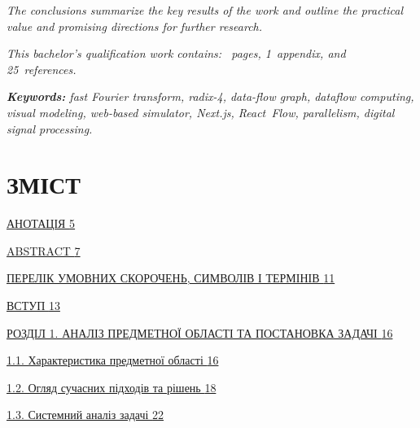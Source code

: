 \documentclass[
]{article}
\begin{document}
\emph{The conclusions summarize the key results of the work and outline
the practical value and promising directions for further research.}

\emph{This bachelor's qualification work contains: ~pages, 1~appendix,
and 25~references.}

\emph{\textbf{Keywords:} fast Fourier transform, radix-4, data-flow
graph, dataflow computing, visual modeling, web-based simulator,
Next.js, React~Flow, parallelism, digital signal processing.}

\emph{\hfill\break
}

\section{\texorpdfstring{\textbf{ЗМІСТ}}{ЗМІСТ}}\label{ux437ux43cux456ux441ux442}

\hyperref[_Toc230130247]{АНОТАЦІЯ \hyperref[_Toc230130247]{5}}

\hyperref[_Toc230130248]{ABSTRACT \hyperref[_Toc230130248]{7}}

\hyperref[_Toc230130249]{ПЕРЕЛІК УМОВНИХ СКОРОЧЕНЬ, СИМВОЛІВ І ТЕРМІНІВ
\hyperref[_Toc230130249]{11}}

\hyperref[_Toc230130250]{ВСТУП \hyperref[_Toc230130250]{13}}

\hyperref[_Toc230130251]{РОЗДІЛ 1. АНАЛІЗ ПРЕДМЕТНОЇ ОБЛАСТІ ТА
ПОСТАНОВКА ЗАДАЧІ \hyperref[_Toc230130251]{16}}

\hyperref[ux445ux430ux440ux430ux43aux442ux435ux440ux438ux441ux442ux438ux43aux430-ux43fux440ux435ux434ux43cux435ux442ux43dux43eux457-ux43eux431ux43bux430ux441ux442ux456]{1.1.
Характеристика предметної області
\hyperref[ux445ux430ux440ux430ux43aux442ux435ux440ux438ux441ux442ux438ux43aux430-ux43fux440ux435ux434ux43cux435ux442ux43dux43eux457-ux43eux431ux43bux430ux441ux442ux456]{16}}

\hyperref[ux43eux433ux43bux44fux434-ux441ux443ux447ux430ux441ux43dux438ux445-ux43fux456ux434ux445ux43eux434ux456ux432-ux442ux430-ux440ux456ux448ux435ux43dux44c]{1.2.
Огляд сучасних підходів та рішень
\hyperref[ux43eux433ux43bux44fux434-ux441ux443ux447ux430ux441ux43dux438ux445-ux43fux456ux434ux445ux43eux434ux456ux432-ux442ux430-ux440ux456ux448ux435ux43dux44c]{18}}

\hyperref[ux441ux438ux441ux442ux435ux43cux43dux438ux439-ux430ux43dux430ux43bux456ux437-ux437ux430ux434ux430ux447ux456]{1.3.
Системний аналіз задачі
\hyperref[ux441ux438ux441ux442ux435ux43cux43dux438ux439-ux430ux43dux430ux43bux456ux437-ux437ux430ux434ux430ux447ux456]{22}}
\end{document}
